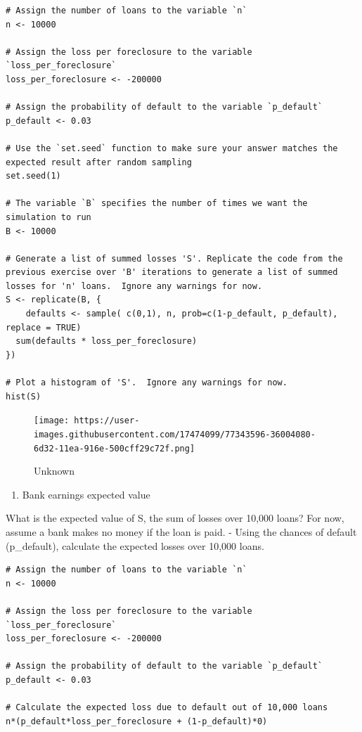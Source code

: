 \documentclass[
]{article}
\providecommand{\tightlist}{%
  \setlength{\itemsep}{0pt}\setlength{\parskip}{0pt}}
\begin{document}
\begin{verbatim}
# Assign the number of loans to the variable `n`
n <- 10000

# Assign the loss per foreclosure to the variable `loss_per_foreclosure`
loss_per_foreclosure <- -200000

# Assign the probability of default to the variable `p_default`
p_default <- 0.03

# Use the `set.seed` function to make sure your answer matches the expected result after random sampling
set.seed(1)

# The variable `B` specifies the number of times we want the simulation to run
B <- 10000

# Generate a list of summed losses 'S'. Replicate the code from the previous exercise over 'B' iterations to generate a list of summed losses for 'n' loans.  Ignore any warnings for now.
S <- replicate(B, {
    defaults <- sample( c(0,1), n, prob=c(1-p_default, p_default), replace = TRUE) 
  sum(defaults * loss_per_foreclosure)
})

# Plot a histogram of 'S'.  Ignore any warnings for now.
hist(S)
\end{verbatim}

\begin{figure}
\centering
\texttt{[image: https://user-images.githubusercontent.com/17474099/77343596-36004080-6d32-11ea-916e-500cff29c72f.png]}
\caption{Unknown}
\end{figure}

\begin{enumerate}
\def\labelenumi{\arabic{enumi}.}
\setcounter{enumi}{2}
\tightlist
\item
  Bank earnings expected value
\end{enumerate}

What is the expected value of S, the sum of losses over 10,000 loans?
For now, assume a bank makes no money if the loan is paid. - Using the
chances of default (p\_default), calculate the expected losses over
10,000 loans.

\begin{verbatim}
# Assign the number of loans to the variable `n`
n <- 10000

# Assign the loss per foreclosure to the variable `loss_per_foreclosure`
loss_per_foreclosure <- -200000

# Assign the probability of default to the variable `p_default`
p_default <- 0.03

# Calculate the expected loss due to default out of 10,000 loans
n*(p_default*loss_per_foreclosure + (1-p_default)*0)
\end{verbatim}
\end{document}
